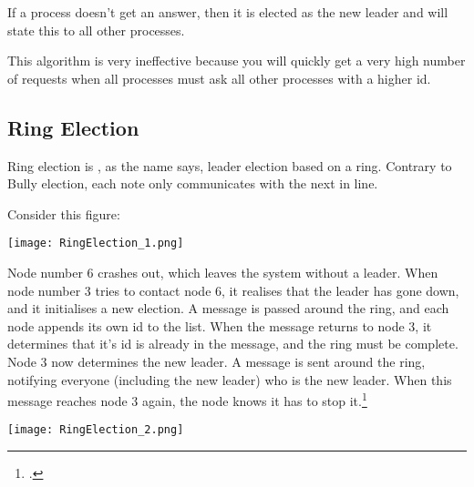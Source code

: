 If a process doesn't get an answer, then it is elected as the new leader and will state this to all other processes.

This algorithm is very ineffective because you will quickly get a very high number of requests when all processes must ask all other processes with a higher id.

\subsection{Ring Election}
Ring election is , as the name says, leader election based on a ring. Contrary to Bully election, each note only communicates with the next in line.

Consider this figure:

\begin{center}
	\texttt{[image: RingElection\_1.png]}
\end{center}

Node number 6 crashes out, which leaves the system without a leader. When node number 3 tries to contact node 6, it realises that the leader has gone down, and it initialises a new election. A message is passed around the ring, and each node appends its own id to the list. When the message returns to node 3, it determines that it's id is already in the message, and the ring must be complete. Node 3 now determines the new leader. A message is sent around the ring, notifying everyone (including the new leader) who is the new leader. When this message reaches node 3 again, the node knows it has to stop it.\footcite{colostate_RingElec}

\begin{center}
	\texttt{[image: RingElection\_2.png]}
\end{center} 
